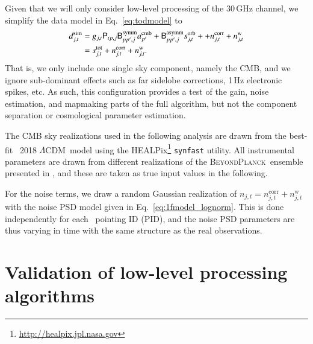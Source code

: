 \documentclass[twocolumn]{aa}%
\def\LCDM{$\Lambda$CDM}
\newcommand{\B}[0]{\tens{B}}
\renewcommand{\P}[0]{\tens{P}}
\newcommand{\BP}{\textsc{BeyondPlanck}}
\begin{document}
Given that we will only consider low-level processing of the 30\,GHz
channel, we simplify the data model in Eq.~\eqref{eq:todmodel} to
\begin{align}
  d_{j,t}^{\mathrm{sim}} &= g_{j,t}\P_{tp,j}
      \B^{\mathrm{symm}}_{pp',j} a^\mathrm{cmb}_{p'}  +
      \B^{\mathrm{asymm}}_{pp',j} s^{\mathrm{orb}}_{j,t} + 
      + n^{\mathrm{corr}}_{j,t} + n^{\mathrm{w}}_{j,t}\\
      &= s^{\mathrm{tot}}_{j,t} + n^{\mathrm{corr}}_{j,t} + n^{\mathrm{w}}_{j,t}.
    \label{eq:todmodel2}
\end{align}
That is, we only include one single sky component, namely the CMB, and
we ignore sub-dominant effects such as far sidelobe corrections, 1\,Hz
electronic spikes, etc. As such, this configuration provides a
test of the gain, noise estimation, and mapmaking parts of the full
algorithm, but not the component separation or cosmological
parameter estimation. 

The CMB sky realizations used in the following analysis are drawn from
the best-fit \Planck\ 2018 \LCDM\ model \citep{planck2016-l05} using the
HEALPix\footnote{\url{http://healpix.jpl.nasa.gov}} \citep{gorski2005}
\texttt{synfast} utility. All instrumental parameters are drawn from
different realizations of the \BP\ ensemble presented in \citet{bp01},
and these are taken as true input values in the following. 

For the noise terms, we draw a random Gaussian realization of
$n_{j,t}= n^{\mathrm{corr}}_{j,t} + n^{\mathrm{w}}_{j,t}$ with the
noise PSD model given in Eq.~\eqref{eq:1fmodel_lognorm}. This is done
independently for each \Planck\ pointing ID (PID), and the noise PSD
parameters are thus varying in time with the same structure as the real
observations. 


\section{Validation of low-level processing algorithms}
\label{sec:validation}
\end{document}
